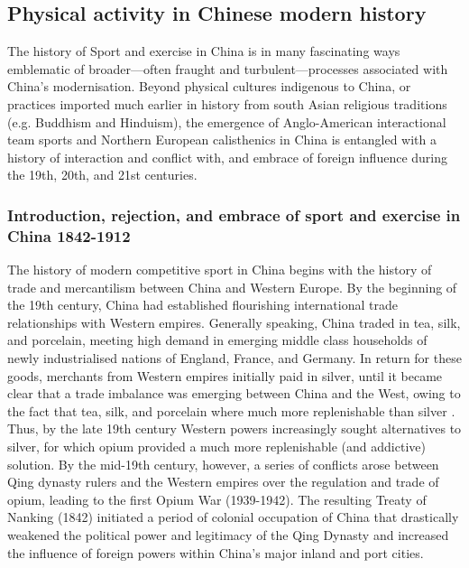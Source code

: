 {\subsection{Physical activity in Chinese modern history}
The history of Sport and exercise in China is in many fascinating ways emblematic of broader---often fraught and turbulent---processes associated with China's modernisation.  Beyond physical cultures indigenous to China, or practices imported much earlier in history from south Asian religious traditions (e.g. Buddhism and Hinduism), the emergence of Anglo-American interactional team sports and Northern European calisthenics in China is entangled with a history of interaction and conflict with, and embrace of foreign influence during the 19th, 20th, and 21st centuries.

  \subsubsection{Introduction, rejection, and embrace of sport and exercise in China 1842-1912}

The history of modern competitive sport in China begins with the history of trade and mercantilism between China and Western Europe.
By the beginning of the 19th century, China had established flourishing international trade relationships with Western empires.  Generally speaking, China traded in tea, silk, and porcelain, meeting high demand in emerging middle class households of newly industrialised nations of England, France, and Germany.  In return for these goods, merchants from Western empires initially paid in silver, until it became clear that a trade imbalance was emerging between China and the West, owing to the fact that tea, silk, and porcelain where much more replenishable than silver \citep{Fay2005}.  Thus, by the late 19th century Western powers increasingly sought alternatives to silver, for which opium provided a much more replenishable (and addictive) solution.  By the mid-19th century, however, a series of conflicts arose between Qing dynasty rulers and the Western empires over the regulation and trade of opium, leading to the first Opium War (1939-1942).  The resulting Treaty of Nanking (1842) initiated a period of colonial occupation of China that drastically weakened the political power and legitimacy of the Qing Dynasty and increased the influence of foreign powers within China's major inland and port cities.

}
